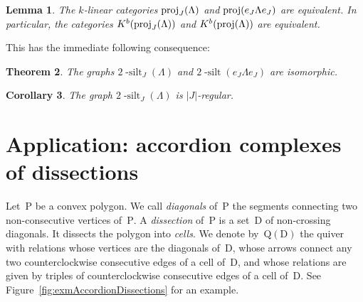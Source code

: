 \documentclass{amsart}
\newtheorem{theorem}{Theorem}%
\newtheorem{corollary}[theorem]{Corollary}
\newtheorem{lemma}[theorem]{Lemma}
\theoremstyle{definition}
\newcommand{\fref}[1]{Figure~\ref{#1}} %
\newcommand{\darkblue}{\color{darkblue}} %
\newcommand{\defn}[1]{\textsl{\darkblue #1}} %
\newcommand{\polygon}{\mathrm{P}} %
\newcommand{\dissection}{\mathrm{D}} %
\newcommand{\quiver}{\mathrm{Q}} %
\newcommand{\silt}{2 \! \operatorname{-silt}}
\newcommand{\proj}{\operatorname{{\rm proj }}}
\begin{document}
\begin{lemma}
 The $k$-linear categories $\proj_J(\Lambda)$ and $\proj(e_J\Lambda e_J)$ are equivalent.
 In particular, the categories $K^b(\proj_J(\Lambda))$ and $K^b(\proj(\Lambda))$ are equivalent.
\end{lemma}

This has the immediate following consequence:

\begin{theorem}
 The graphs $\silt_J(\Lambda)$ and $\silt(e_J \Lambda e_J)$ are isomorphic.
\end{theorem}

\begin{corollary}
 The graph $\silt_J(\Lambda)$ is $|J|$-regular.
\end{corollary}


\section{Application: accordion complexes of dissections}
\label{sec:accordions}

Let~$\polygon$ be a convex polygon.
We call \defn{diagonals} of~$\polygon$ the segments connecting two non-consecutive vertices of~$\polygon$.
A \defn{dissection} of~$\polygon$ is a set~$\dissection$ of non-crossing diagonals.
It dissects the polygon into \defn{cells}.
We denote by~$\quiver(\dissection)$ the quiver with relations whose vertices are the diagonals of~$\dissection$, whose arrows connect any two counterclockwise consecutive edges of a cell of~$\dissection$, and whose relations are given by triples of counterclockwise consecutive edges of a cell of~$\dissection$.
See \fref{fig:exmAccordionDissections} for an example.
\end{document}
